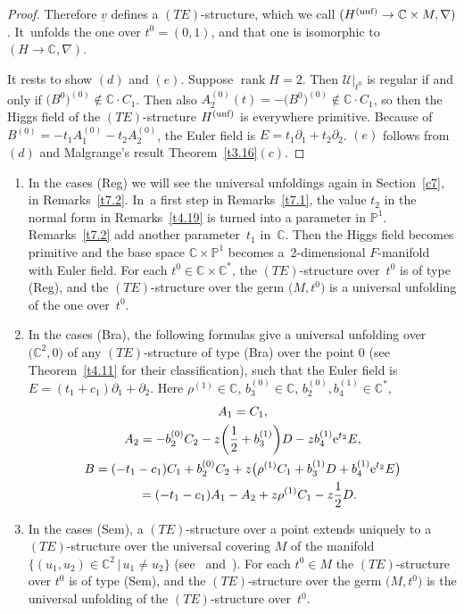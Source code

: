 \documentclass[pdftex]{sigma}%
\numberwithin{equation}{section}
\numberwithin{figure}{section}
\newcommand{\C}{{\mathbb C}}
\renewcommand{\P}{{\mathbb P}}
\newcommand{\UU}{{\mathcal U}}
\newcommand{\uuuu}{\underline}
\newcommand{\paa}{\partial}
\newcommand{\nnn}{\nabla}
\DeclareMathOperator{\rank}{rank}
\begin{document}
\begin{proof}
Therefore $\uuuu{v}$ defines a $(TE)$-structure,
which we call $(H^{\rm (unf)}\to\C\times M,\nnn)$. It~unfolds the one over $t^0=(0,1)$,
and that one is isomorphic to $(H\to\C,\nnn)$.

It rests to show $(d)$ and $(e)$.
Suppose $\rank H=2$.
Then $\UU|_{t^0}$ is regular if and only if
$\big(B^0\big)^{(0)}\notin \C\cdot C_1$.
Then also $A_2^{(0)}(t)=-\big(B^0\big)^{(0)}\notin\C\cdot C_1$,
so then the Higgs field of the $(TE)$-structure $H^{\rm (unf)}$
is everywhere primitive.
Because of $B^{(0)}=-t_1A_1^{(0)}-t_2A_2^{(0)}$,
the Euler field is $E=t_1\paa_1+t_2\paa_2$.
$(e)$ follows from $(d)$ and Malgrange's result
Theorem~\ref{t3.16}$(c)$.
\end{proof}


\begin{Remarks}\label{t5.3}\qquad
\begin{enumerate}\itemsep=0pt
\item[$(i)$] In the cases (Reg) we will see the universal unfoldings
again in Section~\ref{c7}, in Remarks~\ref{t7.2}. In~a first step in Remarks~\ref{t7.1}, the value $t_2$
in the normal form in Remarks~\ref{t4.19} is
turned into a parameter in $\P^1$.
Remarks~\ref{t7.2} add another parameter~$t_1$ in~$\C$.
Then the Higgs field becomes primitive and
the base space $\C\times\P^1$
becomes a~2-dimensional $F$-manifold with Euler field.
For each $t^0\in\C\times\C^*$, the $(TE)$-structure over~$t^0$
is of type (Reg), and the $(TE)$-structure over the
germ $\big(M,t^0\big)$ is a universal unfolding of the one over~$t^0$.

\item[$(ii)$] In the cases (Bra), the following formulas give
a universal unfolding over $\big(\C^2,0\big)$ of any $(TE)$-structure
of type (Bra) over the point 0 (see Theorem~\ref{t4.11} for
their classification), such that the Euler field
is $E=(t_1+c_1)\paa_1+\paa_2$. Here $\rho^{(1)}\in\C$,
$b_3^{(0)}\in\C$, $b_2^{(0)},b_4^{(1)}\in\C^*$,
\begin{gather*}%
A_1= C_1,
\\
A_2= -b_2^{(0)}C_2 -z\bigg(\frac{1}{2}+b_3^{(1)}\bigg)D
- z b_4^{(1)}{\rm e}^{t_2}E,%
\\
B= (-t_1-c_1)C_1+b_2^{(0)}C_2 + z\big(\rho^{(1)}C_1+b_3^{(1)}D+
b_4^{(1)}{\rm e}^{t_2}E\big)
\\ \hphantom{B}
{}= (-t_1-c_1)A_1 - A_2 + z\rho^{(1)}C_1-z\frac{1}{2}D.
\end{gather*}

\item[$(iii)$] In the cases (Sem), a $(TE)$-structure over a point
extends uniquely to a $(TE)$-structure over the
universal covering $M$ of the manifold
$\big\{(u_1,u_2)\in\C^2\,|\, u_1\neq u_2\big\}$ (see~\cite{Ma83b} and~\cite[Chapter~III, Theorem~2.10]{Sa02}).
For each $t^0\in M$ the $(TE)$-structure over $t^0$
is of type (Sem), and the $(TE)$-structure over the germ
$\big(M,t^0\big)$ is the universal unfolding of the $(TE)$-structure
over~$t^0$.
\end{enumerate}
\end{Remarks}
\end{document}
